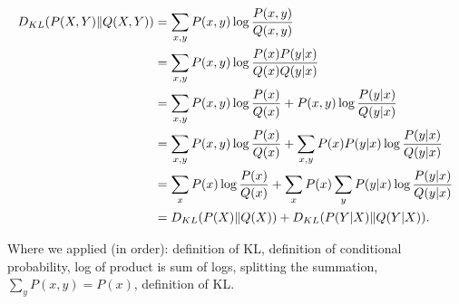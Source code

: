 \begin{answer}
\begin{align*}
D_{KL}(P(X,Y)\|Q(X,Y))
&= \sum_{x,y} P(x,y)\log\frac{P(x,y)}{Q(x,y)}\\
&= \sum_{x,y} P(x,y)\log\frac{P(x)P(y|x)}{Q(x)Q(y|x)}\\
&= \sum_{x,y} P(x,y)\log\frac{P(x)}{Q(x)}
  + P(x,y)\log\frac{P(y|x)}{Q(y|x)}\\
&= \sum_{x,y} P(x,y)\log\frac{P(x)}{Q(x)}
  +\sum_{x,y} P(x)P(y|x)\log\frac{P(y|x)}{Q(y|x)}\\
&= \sum_x P(x) \log\frac{P(x)}{Q(x)}
  +\sum_x P(x) \sum_y P(y|x)\log\frac{P(y|x)}{Q(y|x)}\\
&= D_{KL}(P(X)\|Q(X)) + D_{KL}(P(Y|X)\|Q(Y|X)).
\end{align*}

Where we applied (in order): definition of KL, definition of
conditional probability, log of product is sum of logs, splitting
the summation, $\sum_y P(x,y)=P(x)$, definition of KL.
\end{answer}
